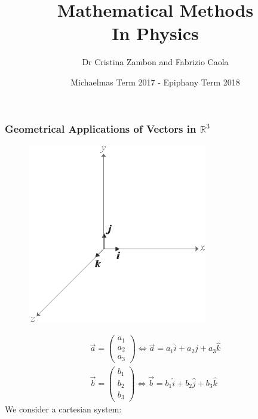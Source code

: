 \documentclass[a4paper, 11pt, normalem]{report}
\title{Mathematical Methods \\ In Physics \vspace{-20pt}}
\author{Dr Cristina Zambon and Fabrizio Caola}
\date{\vspace{-15pt}Michaelmas Term 2017 - Epiphany Term 2018}
\newcommand\R{\mathbb{R}}
\begin{document}
\maketitle
\tableofcontents

\part{}
\chapter{}
\section{Geometrical Applications of Vectors in $\R^3$}
\begin{figure}
    \begin{center}
        \includegraphics[scale=0.5]{Cart.png}
    \end{center}
\end{figure}
\begin{gather*}
    \vec{a} =
    \begin{pmatrix}
        a_1 \\
        a_2 \\
        a_3
    \end{pmatrix}
    \iff
    \vec{a} = a_{1}\hat{i} + a_{2}\hat{j} + a_{3}\hat{k} \\
    \vec{b} =
    \begin{pmatrix}
        b_1 \\
        b_2 \\
        b_3
    \end{pmatrix}
    \iff
    \vec{b} = b_{1}\hat{i} + b_{2}\hat{j} + b_{3}\hat{k}
\end{gather*}
We consider a cartesian system:
\end{document}
